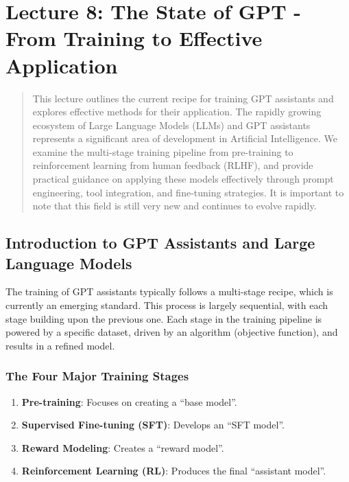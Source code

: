 
\section{Lecture 8: The State of GPT - From Training to Effective Application}

\begin{abstract}
This lecture outlines the current recipe for training GPT assistants and explores effective methods for their application. The rapidly growing ecosystem of Large Language Models (LLMs) and GPT assistants represents a significant area of development in Artificial Intelligence. We examine the multi-stage training pipeline from pre-training to reinforcement learning from human feedback (RLHF), and provide practical guidance on applying these models effectively through prompt engineering, tool integration, and fine-tuning strategies. It is important to note that this field is still very new and continues to evolve rapidly.
\end{abstract}

\subsection{Introduction to GPT Assistants and Large Language Models}

The training of GPT assistants typically follows a multi-stage recipe, which is currently an emerging standard. This process is largely sequential, with each stage building upon the previous one. Each stage in the training pipeline is powered by a specific dataset, driven by an algorithm (objective function), and results in a refined model.

\subsubsection{The Four Major Training Stages}

\begin{enumerate}
    \item \textbf{Pre-training}: Focuses on creating a ``base model''.
    \item \textbf{Supervised Fine-tuning (SFT)}: Develops an ``SFT model''.
    \item \textbf{Reward Modeling}: Creates a ``reward model''.
    \item \textbf{Reinforcement Learning (RL)}: Produces the final ``assistant model''.
\end{enumerate}

